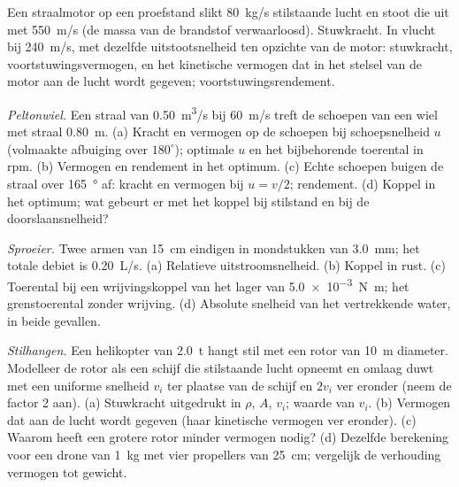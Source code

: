\begin{exercise}[$\star$]\label{exo:b2:flow-balances:4}
Een straalmotor op een proefstand slikt \qty{80}{kg/s} stilstaande lucht en
stoot die uit met \qty{550}{m/s} (de massa van de brandstof verwaarloosd).
Stuwkracht. In vlucht bij \qty{240}{m/s}, met dezelfde uitstootsnelheid ten
opzichte van de motor: stuwkracht, voortstuwingsvermogen, en het kinetische
vermogen dat in het stelsel van de motor aan de lucht wordt gegeven;
voortstuwingsrendement.
\end{exercise}

\begin{exercise}[$\star\star$]\label{exo:b2:flow-balances:5}
\emph{Peltonwiel.} Een straal van \qty{0.50}{m^3/s} bij \qty{60}{m/s} treft
de schoepen van een wiel met straal \qty{0.80}{m}. (a) Kracht en vermogen op
de schoepen bij schoepsnelheid $u$ (volmaakte afbuiging over $180^\circ$);
optimale $u$ en het bijbehorende toerental in rpm. (b) Vermogen en rendement
in het optimum. (c) Echte schoepen buigen de straal over \qty{165}{\degree}
af: kracht en vermogen bij $u = v/2$; rendement. (d) Koppel in het optimum;
wat gebeurt er met het koppel bij stilstand en bij de doorslaansnelheid?
\end{exercise}

\begin{exercise}[$\star\star$]\label{exo:b2:flow-balances:6}
\emph{Sproeier.} Twee armen van \qty{15}{cm} eindigen in mondstukken van
\qty{3.0}{mm}; het totale debiet is \qty{0.20}{L/s}. (a) Relatieve
uitstroomsnelheid. (b) Koppel in rust. (c) Toerental bij een wrijvingskoppel
van het lager van \qty{5.0e-3}{N.m}; het grenstoerental zonder wrijving. (d)
Absolute snelheid van het vertrekkende water, in beide gevallen.
\end{exercise}

\begin{exercise}[$\star\star$]\label{exo:b2:flow-balances:7}
\emph{Stilhangen.} Een helikopter van \qty{2.0}{t} hangt stil met een rotor
van \qty{10}{m} diameter. Modelleer de rotor als een schijf die stilstaande
lucht opneemt en omlaag duwt met een uniforme snelheid $v_i$ ter plaatse van
de schijf en $2v_i$ ver eronder (neem de factor 2 aan). (a) Stuwkracht
uitgedrukt in $\rho$, $A$, $v_i$; waarde van $v_i$. (b) Vermogen dat aan de
lucht wordt gegeven (haar kinetische vermogen ver eronder). (c) Waarom heeft
een grotere rotor minder vermogen nodig? (d) Dezelfde berekening voor een
drone van \qty{1}{kg} met vier propellers van \qty{25}{cm}; vergelijk de
verhouding vermogen tot gewicht.
\end{exercise}


